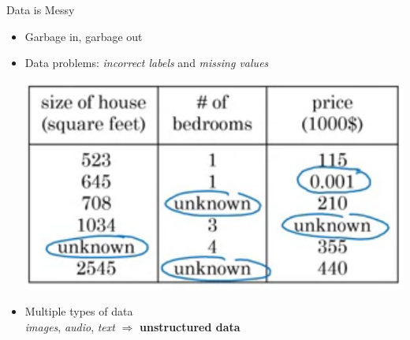 \documentclass[pdf]{beamer}
\theoremstyle{mystyle}
\begin{document}
\begin{frame}{Data is Messy}
	\begin{itemize}
		\item<2-> Garbage in, garbage out
		\item<3-> Data problems: \textit{incorrect labels} and \textit{missing values} 
		\begin{center}
			\includegraphics[scale=.3]{data-problems} 
		\end{center}
		\item<4-> Multiple types of data \\
		\textit{images}, \textit{audio}, \textit{text} $\Rightarrow$ \textbf{unstructured data}					
	\end{itemize}
\end{frame}
\end{document}
